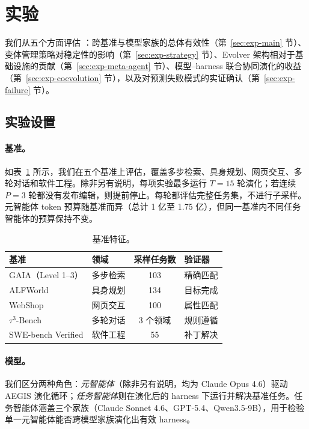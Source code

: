 \section{实验}
\label{sec:experiments}

我们从五个方面评估 \ProjectName：跨基准与模型家族的总体有效性（第~\ref{sec:exp-main} 节）、变体管理策略对稳定性的影响（第~\ref{sec:exp-strategy} 节）、Evolver 架构相对于基础设施的贡献（第~\ref{sec:exp-meta-agent} 节）、模型--harness 联合协同演化的收益（第~\ref{sec:exp-coevolution} 节），以及对预测失败模式的实证确认（第~\ref{sec:exp-failure} 节）。

\subsection{实验设置}
\label{sec:exp-setup}

\paragraph{基准。}
如表~\ref{tab:benchmarks} 所示，我们在五个基准上评估，覆盖多步检索、具身规划、网页交互、多轮对话和软件工程。除非另有说明，每项实验最多运行 $T{=}15$ 轮演化；若连续 $P{=}3$ 轮都没有发布编辑，则提前停止。每轮都评估完整任务集，不进行子采样。元智能体 token 预算随基准而异（总计 1 亿至 1.75 亿），但同一基准内不同任务智能体的预算保持不变。

\begin{table}[!htbp]
\centering
\small
\caption{基准特征。}
\label{tab:benchmarks}
\begin{tabular}{llcl}
\toprule
\textbf{基准} & \textbf{领域} & \textbf{采样任务数} & \textbf{验证器} \\
\midrule
GAIA（Level 1--3） & 多步检索 & 103 & 精确匹配 \\
ALFWorld & 具身规划 & 134 & 目标完成 \\
WebShop & 网页交互 & 100 & 属性匹配 \\
$\tau^3$-Bench & 多轮对话 & 3 个领域 & 规则遵循 \\
SWE-bench Verified & 软件工程 & 55 & 补丁解决 \\
\bottomrule
\end{tabular}
\end{table}

\paragraph{模型。}
我们区分两种角色：\textit{元智能体}（除非另有说明，均为 Claude Opus 4.6）驱动 AEGIS 演化循环；\textit{任务智能体}则在演化后的 harness 下运行并解决基准任务。任务智能体涵盖三个家族（Claude Sonnet 4.6、GPT-5.4、Qwen3.5-9B），用于检验单一元智能体能否跨模型家族演化出有效 harness。

